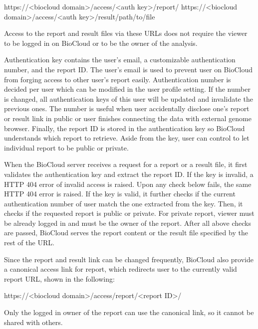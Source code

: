 \begin{CVerbatim}[fontsize=\small]
https://<biocloud domain>/access/<auth key>/report/
https://<biocloud domain>/access/<auth key>/result/path/to/file
\end{CVerbatim}

\vspace{-1em}\noindent
Access to the report and result files via these URLs does not require the
viewer to be logged in on BioCloud or to be the owner of the analysis.

Authentication key contains the user's email, a customizable authentication
number, and the report ID. The user's email is used to prevent user on BioCloud
from forging access to other user's report easily. Authentication number is
decided per user which can be modified in the user profile setting. If the
number is changed, all authentication keys of this user will be updated and
invalidate the previous ones. The number is useful when user accidentally
disclose one's report or result link in public or user finishes connecting the
data with external genome browser. Finally, the report ID is stored in the
authentication key so BioCloud understands which report to retrieve. Aside from
the key, user can control to let individual report to be public or private.

When the BioCloud server receives a request for a report or a result file, it
first validates the authentication key and extract the report ID. If the key is
invalid, a HTTP 404 error of invalid access is raised. Upon any check below
fails, the same HTTP 404 error is raised. If the key is valid, it further
checks if the current authentication number of user match the one extracted
from the key. Then, it checks if the requested report is public or private. For
private report, viewer must be already logged in and must be the owner of the
report. After all above checks are passed, BioCloud serves the report content
or the result file specified by the rest of the URL.

Since the report and result link can be changed frequently, BioCloud also
provide a canonical access link for report, which redirects user to the
currently valid report URL, shown in the following:

\begin{CVerbatim}[fontsize=\small]
https://<biocloud domain>/access/report/<report ID>/
\end{CVerbatim}

\vspace{-1em}\noindent
Only the logged in owner of the report can use the canonical link, so it cannot
be shared with others.



